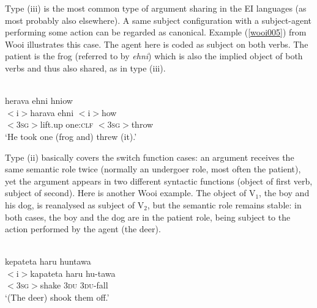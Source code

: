 Type (iii) is the most common type of argument sharing in the EI languages (as most probably also elsewhere). A same subject configuration with a subject-agent performing some action can be regarded as canonical. Example (\ref{wooi005}) from Wooi illustrates this case. The agent here is coded as subject on both verbs. The patient is the frog (referred to by \textit{ehni}) which is also the implied object of both verbs and thus also shared, as in type (iii).

\ea \label{wooi005}
\\
\glll herava ehni hniow \\
$<$i$>$harava ehni $<$i$>$how \\
$<$3\textsc{sg}$>$lift.up one:\textsc{clf} $<$3\textsc{sg}$>$throw \\
\glft `He took one (frog and) threw (it).'\\ 
\z

Type (ii) basically covers the switch function cases: an argument receives the same semantic role twice (normally an undergoer role, most often the patient), yet the argument appears in two different syntactic functions (object of first verb, subject of second). Here is another Wooi example. The object of V$_1$, the boy and his dog, is reanalysed as subject of V$_2$, but the semantic role remains stable: in both cases, the boy and the dog are in the patient role, being subject to the action performed by the agent (the deer).

\ea 
{}\\
\glll kepateta haru huntawa \\
$<$i$>$kapateta haru hu-tawa \\
$<$3\textsc{sg}$>$shake 3\textsc{du} 3\textsc{du}-fall \\
\glft `(The deer) shook them off.'\\ 
\z

